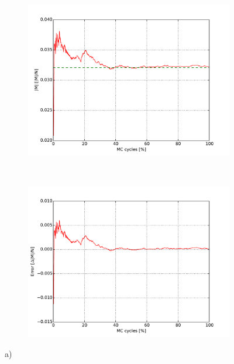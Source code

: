 \begin{figure}[H]
    \centering
    \begin{subfigure}{0.5\textwidth}
        \centering
        \includegraphics[width=\linewidth]{result/bilder/2x2/cv22}
        \caption{}
    \end{subfigure}%
    ~ 
    \begin{subfigure}{0.5\textwidth}
        \centering
        \includegraphics[width=\linewidth]{result/bilder/2x2/cverror22}
        \caption{}
    \end{subfigure}
    \caption{a) }
    \label{fig:22-energy}
\end{figure}

